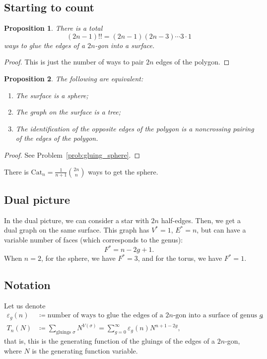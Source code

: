 \documentclass[letterpaper,11pt,oneside,reqno]{article}
\numberwithin{equation}{section}
\newtheorem{proposition}{Proposition}[section]
\theoremstyle{definition}
\begin{document}
\subsection{Starting to count}

\begin{proposition}
	There is a total
	\begin{equation*}
		(2n-1)!!=(2n-1)(2n-3)\cdots 3\cdot 1
	\end{equation*}
	ways to glue the edges of a $2n$-gon into a surface.
\end{proposition}
\begin{proof}
	This is just the number of ways to pair $2n$ edges of the polygon.
\end{proof}

\begin{proposition}
	\label{prop:gluing_sphere}
	The following are equivalent:
	\begin{enumerate}
		\item The surface is a sphere;
		\item The graph on the surface is a tree;
		\item The identification of the opposite edges of the polygon is a \emph{noncrossing pairing} of the edges of the polygon.
	\end{enumerate}
\end{proposition}
\begin{proof}
	See Problem~\ref{prob:gluing_sphere}.
\end{proof}
There is $\mathrm{Cat}_n=\frac{1}{n+1}\binom{2n}{n}$ ways to get the sphere.


\subsection{Dual picture}

In the dual picture, we can consider a star with $2n$ half-edges. Then, we get a dual graph on the
same surface. This graph has $V^*=1$, $E^*=n$, but can have a variable number of faces (which corresponds to the genus):
\begin{equation*}
	F^*=n-2g+1.
\end{equation*}
When $n=2$, for the sphere, we have $F^*=3$, and for the torus, we have $F^*=1$.


\subsection{Notation}

Let us denote
\begin{align}
	\label{eq:epsg-def}
	\varepsilon_g(n)
	&\coloneqq\text{number of ways to glue the edges of a $2n$-gon into a surface of genus $g$},\\
	\label{eq:Tn-def}
	T_n(N)
	&\coloneqq
	\sum_{\text{gluings }\sigma}N^{V(\sigma)}
	=
	\sum_{g=0}^{\infty}\varepsilon_g(n)N^{n+1-2g},
\end{align}
that is, this is the generating function
of the gluings of the edges of a $2n$-gon, where
$N$ is the generating function variable.
\end{document}
